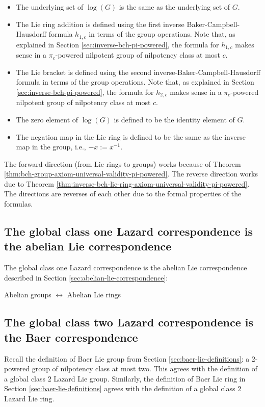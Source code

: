 \begin{itemize}
\item The underlying set of $\log(G)$ is the same as the underlying set of
  $G$.
\item The Lie ring addition is defined using the first inverse
  Baker-Campbell-Hausdorff formula $h_{1,c}$ in terms of the group
  operations. Note that, as explained in Section
  \ref{sec:inverse-bch-pi-powered}, the formula for $h_{1,c}$ makes
  sense in a $\pi_c$-powered nilpotent group of nilpotency class at most
  $c$.
\item The Lie bracket is defined using the second
  inverse-Baker-Campbell-Hausdorff formula in terms of the group
  operations. Note that, as explained in Section
  \ref{sec:inverse-bch-pi-powered}, the formula for $h_{2,c}$ makes
  sense in a $\pi_c$-powered nilpotent group of nilpotency class at most
  $c$.
\item The zero element of $\log(G)$ is defined to be the identity
  element of $G$.
\item The negation map in the Lie ring is defined to be the same as
  the inverse map in the group, i.e., $-x := x^{-1}$.
\end{itemize}

The forward direction (from Lie rings to groups) works because of
Theorem \ref{thm:bch-group-axiom-universal-validity-pi-powered}. The
reverse direction works due to Theorem
\ref{thm:inverse-bch-lie-ring-axiom-universal-validity-pi-powered}. The
directions are reverses of each other due to the formal properties of
the formulas.

\subsection{The global class one Lazard correspondence is the abelian Lie correspondence}

The global class one Lazard correspondence is the abelian Lie
correspondence described in Section
\ref{sec:abelian-lie-correspondence}:

\begin{center}
  Abelian groups $\leftrightarrow$ Abelian Lie rings
\end{center}
\subsection{The global class two Lazard correspondence is the Baer correspondence}

Recall the definition of Baer Lie group from Section
\ref{sec:baer-lie-definitions}: a $2$-powered group of nilpotency
class at most two. This agrees with the definition of a global class
$2$ Lazard Lie group. Similarly, the definition of Baer Lie ring in
Section \ref{sec:baer-lie-definitions} agrees with the definition of a
global class $2$ Lazard Lie ring.


